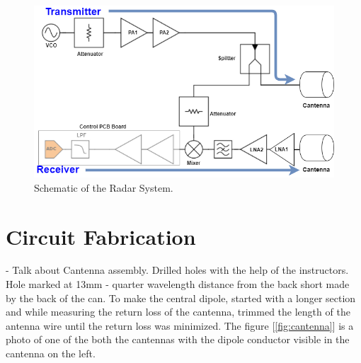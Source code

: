 \documentclass[reprint, aps, prl]{revtex4-1}
\begin{document}
\begin{figure}[!htbp]
    \centering
    \includegraphics[scale=0.35]{radar_schematic}
    \caption{Schematic of the Radar System.}
    \label{fig:radarschematic}
\end{figure}

\section*{Circuit Fabrication}

- Talk about Cantenna assembly. Drilled holes with the help of the instructors. Hole marked at 13mm - quarter wavelength distance from the back short made by the back of the can. To make the central dipole, started with a longer section and while measuring the return loss of the cantenna, trimmed the length of the antenna wire until the return loss was minimized. The figure [\ref{fig:cantenna}] is a photo of one of the both the cantennas with the dipole conductor visible in the cantenna on the left.
\end{document}
